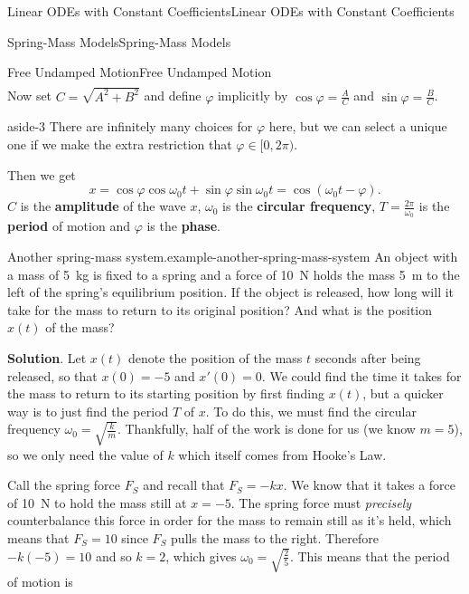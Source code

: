 \documentclass[10pt,]{book}
\newcommand{\terminology}[1]{\textbf{#1}}
\numberwithin{equation}{section}
\begin{document}
\begin{chapterptx}{Linear ODEs with Constant Coefficients}{}{Linear ODEs with Constant Coefficients}{}{}
\begin{sectionptx}{Spring-Mass Models}{}{Spring-Mass Models}{}{}
\begin{subsectionptx}{Free Undamped Motion}{}{Free Undamped Motion}{}{}
\begin{align*}
\end{align*}
Now set \(C = \sqrt{A^{2} + B^{2}}\) and define \(\varphi\) implicitly by \(\cos\varphi = \frac{A}{C}\) and \(\sin\varphi = \frac{B}{C}\). \begin{aside}{}{aside-3}%
\hypertarget{p-203}{}%
There are infinitely many choices for \(\varphi\) here, but we can select a unique one if we make the extra restriction that \(\varphi\in[0,2\pi)\).%
\end{aside}
 Then we get%
\begin{equation*}
x = \cos\varphi\cos\omega_{0}t + \sin\varphi\sin\omega_{0}t = \cos(\omega_{0}t - \varphi).
\end{equation*}
\(C\) is the \terminology{amplitude} of the wave \(x\), \(\omega_{0}\) is the \terminology{circular frequency}, \(T = \frac{2\pi}{\omega_{0}}\) is the \terminology{period} of motion and \(\varphi\) is the \terminology{phase}.%
\begin{example}{Another spring-mass system.}{example-another-spring-mass-system}%
\hypertarget{p-204}{}%
An object with a mass of \SI{5}{\kilo\gram} is fixed to a spring and a force of \SI{10}{\newton} holds the mass \SI{5}{\meter} to the left of the spring's equilibrium position. If the object is released, how long will it take for the mass to return to its original position? And what is the position \(x(t)\) of the mass?%
\par\smallskip%
\noindent\textbf{Solution}.\hypertarget{solution-30}{}\quad%
\hypertarget{p-205}{}%
Let \(x(t)\) denote the position of the mass \(t\) seconds after being released, so that \(x(0) = -5\) and \(x'(0) = 0\). We could find the time it takes for the mass to return to its starting position by first finding \(x(t)\), but a quicker way is to just find the period \(T\) of \(x\). To do this, we must find the circular frequency \(\omega_{0} = \sqrt{\frac{k}{m}}\). Thankfully, half of the work is done for us (we know \(m=5\)), so we only need the value of \(k\) which itself comes from Hooke's Law.%
\par
\hypertarget{p-206}{}%
Call the spring force \(F_{S}\) and recall that \(F_{S} = -kx\). We know that it takes a force of \SI{10}{\newton} to hold the mass still at \(x=-5\). The spring force must \emph{precisely} counterbalance this force in order for the mass to remain still as it's held, which means that \(F_{S} = 10\) since \(F_{S}\) pulls the mass to the right. Therefore \(-k(-5) = 10\) and so \(k=2\), which gives \(\omega_{0} = \sqrt{\frac{2}{5}}\). This means that the period of motion is%
\begin{equation*}

\end{equation*}
\end{example}
\end{subsectionptx}
\end{sectionptx}
\end{chapterptx}
\end{document}
